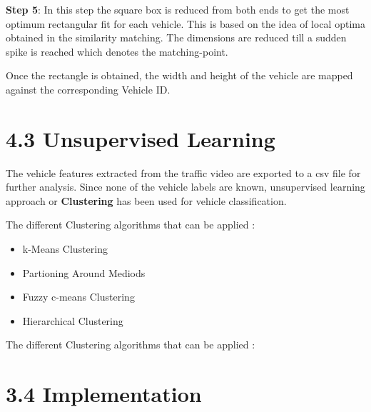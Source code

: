 \documentclass[a4paper,12pt]{article}
\begin{document}
\begin{flushleft}
\textbf{Step 5}: In this step the square box is reduced from both ends to get the most optimum rectangular fit for each vehicle. This is based on the idea of local optima obtained in the similarity matching. The dimensions are reduced till a sudden spike is reached which denotes the matching-point.
\end{flushleft}

\vspace{0.05in}
\begin{flushleft}
Once the rectangle is obtained, the width and height of the vehicle are mapped against the corresponding Vehicle ID.
\end{flushleft}

\section*{\large 4.3 Unsupervised Learning}
\vspace{0.1in}

The vehicle features extracted from the traffic video are exported to a csv file for further analysis. Since none of the vehicle labels are known, unsupervised learning approach or \textbf{Clustering} has been used for vehicle classification.

\begin{flushleft}
The different Clustering algorithms that can be applied :
\end{flushleft} 

\begin{itemize}
\setlength{\itemindent}{.2in}
\item k-Means Clustering
\item Partioning Around Mediods
\item Fuzzy c-means Clustering
\item Hierarchical Clustering
\end{itemize}

\begin{flushleft}
The different Clustering algorithms that can be applied :
\end{flushleft} 

\section*{\large 3.4 Implementation}
\vspace{0.1in}
\end{document}
